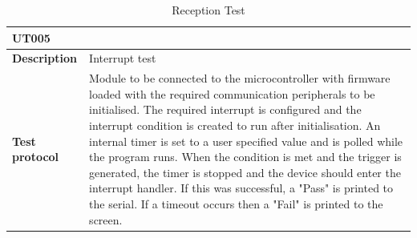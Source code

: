 \begin{table}[H]
	\centering
	\caption{Reception Test}
	\label{tab:UT005}
	\begin{tabular}{m{} m{}}
		\multicolumn{2}{l}{\textbf{UT005} }\\
		\hline
		\textbf{Description} & Interrupt test\\
		\hline
		\hline
		\textbf{Test protocol} & Module to be connected to the microcontroller with firmware loaded with the required communication peripherals to be initialised. The required interrupt is configured and the interrupt condition is created to run after initialisation. An internal timer is set to a user specified value and is polled while the program runs. When the condition is met and the trigger is generated, the timer is stopped and the device should enter the interrupt handler. If this was successful, a "Pass" is printed to the serial. If a timeout occurs then a "Fail" is printed to the screen. \\
		\hline
		\hline
	\end{tabular}
\end{table}


